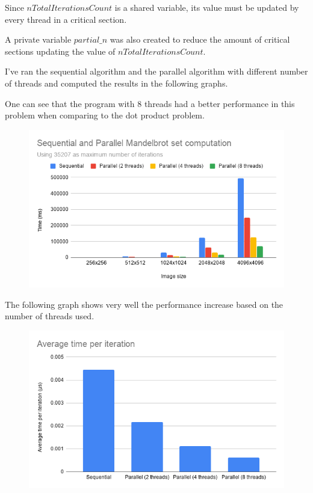 \documentclass[unicode,11pt,a4paper,oneside,numbers=endperiod,openany]{scrartcl}
\begin{document}
\begin{enumerate}
            Since $nTotalIterationsCount$ is a shared variable, its value must be updated by every thread in a critical section.

            A private variable $partial\_n$ was also created to reduce the amount of critical sections updating the value of $nTotalIterationsCount$.

            

    \end{enumerate}


        I've ran the sequential algorithm and the parallel algorithm with different number of threads and computed the results in the following graphs.

        One can see that the program with 8 threads had a better performance in this problem when comparing to the dot product problem.

            \begin{figure}[H]
                \centering
                \includegraphics[width=0.9\linewidth]{"Sequential and Parallel Mandelbrot set computation"}
            \end{figure}

        The following graph shows very well the performance increase based on the number of threads used.

            \begin{figure}[H]
                \centering
                \includegraphics[width=0.9\linewidth]{"Average time per iteration"}
            \end{figure}
\end{document}
